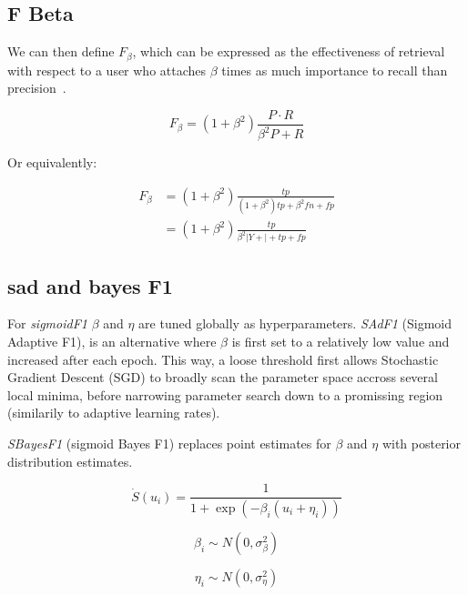 \subsection{F Beta}

We can then define \(F_\beta\), which can be expressed as the effectiveness of retrieval with respect to a user who attaches \(\beta\) times as much importance to recall than precision~\cite{informationRetrieval}.


\begin{equation}
F_{\beta}=\left(1+\beta^{2}\right) \frac{P \cdot R}{\beta^{2} P+R}
\end{equation}

Or equivalently:

\begin{equation}
\begin{aligned} F_{\beta} &=\left(1+\beta^{2}\right) \frac{t p}{\left(1+\beta^{2}\right) t p+\beta^{2} f n+f p} \\ &=\left(1+\beta^{2}\right) \frac{t p}{\beta^{2}|Y+|+t p+f p} \end{aligned}
\end{equation}


\subsection{sad and bayes F1}



For \emph{sigmoidF1} \(\beta\) and \(\eta\) are tuned globally as hyperparameters. \emph{SAdF1} (Sigmoid Adaptive F1), is an alternative where \(\beta\) is first set to a relatively low value and increased after each epoch. This way, a loose threshold first allows Stochastic Gradient Descent (SGD) to broadly scan the parameter space accross several local minima, before narrowing parameter search down to a promissing region (similarily to adaptive learning rates).

\emph{SBayesF1} (sigmoid Bayes F1) replaces point estimates for \(\beta\) and \(\eta\) with posterior distribution estimates. 

\begin{equation}
\dot{S}(u_i) = \frac{1}{1+\exp (-\beta_i (u_i + \eta_i))}
\end{equation}

$$ \beta_i \sim N(0, \sigma^{2}_{\beta}) $$

$$ \eta_i \sim N(0, \sigma^{2}_{\eta}) $$

